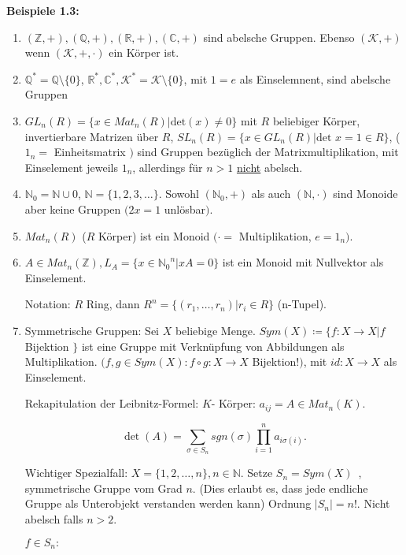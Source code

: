 \documentclass[10pt,a4paper]{article}
\begin{document}
\textbf{Beispiele 1.3:}
\begin{enumerate}
	\item $(\mathbb{Z}, +), (\mathbb{Q}, +), (\mathbb{R}, +), (\mathbb{C}, +)$ sind abelsche Gruppen. Ebenso $(\mathcal{K}, +)$ wenn $(\mathcal{K}, +, \cdot)$ ein Körper ist.
	\item $\mathbb{Q}^* = \mathbb{Q} \setminus \{0\}$, $\mathbb{R}^*, \mathbb{C}^*, \mathcal{K}^* = \mathcal{K} \setminus \{0\}$, mit $1 = e$ als Einselemnent, sind abelsche Gruppen
	\item $GL_n(R) = \{ x \in Mat_n(R) \vert \text{det}(x) \neq 0\}$ mit $R$ beliebiger Körper, invertierbare Matrizen über $R$, $SL_n(R)  = \{ x \in GL_n(R) \vert \text{det }x = 1 \in R \}$, ($1_n = $ Einheitsmatrix $)$ sind Gruppen bezüglich der Matrixmultiplikation, mit Einselement jeweils $1_n$, allerdings für $n > 1$ \underline{nicht} abelsch.
	\item $\mathbb{N}_0 = \mathbb{N} \cup 0$, $\mathbb{N} = \{1,2,3,\dots\}$. Sowohl $(\mathbb{N}_0, +)$ als auch $(\mathbb{N}, \cdot)$ sind Monoide aber keine Gruppen $(2x = 1$ unlösbar$)$.
	\item $Mat_n(R)$ ($R$ Körper) ist ein Monoid $(\cdot = $ Multiplikation, $ e = 1_n)$.
	\item $A \in Mat_n(\mathbb{Z}), L_A = \{ x \in {\mathbb{N}_0}^n \vert xA = 0\}$ ist ein Monoid mit Nullvektor als Einselement.

Notation: $R$ Ring, dann $R^n = \{(r_1, \dots, r_n) \vert r_i \in R\}$ (n-Tupel).
	\item Symmetrische Gruppen: Sei $X$ beliebige Menge. $Sym(X) \coloneqq \{ f : X \to X \vert f$ Bijektion $\}$ ist eine Gruppe mit Verknüpfung von Abbildungen als \glqq Multiplikation\grqq . $(f,g \in Sym(X): f \circ g: X \to X$ Bijektion!$)$, mit $id : X \to X$ als Einselement.
	
	
Rekapitulation der Leibnitz-Formel: $K$- Körper: $a_{ij} = A \in
Mat_n(K)$. 

$$\det(A) = \sum_{\sigma \in S_n} sgn(\sigma)
\prod_{i = 1}^{n} a_{i \sigma(i)}.$$


Wichtiger Spezialfall: $X = \{ 1,2, \dots, n \}, n \in \mathbb{N}$. Setze $S_n = Sym(X)$\glqq\ , symmetrische Gruppe vom Grad $n$\grqq . (Dies erlaubt es, dass jede endliche Gruppe als Unterobjekt verstanden werden kann) Ordnung $\vert S_n \vert = n ! $. Nicht abelsch falls $n > 2$.\bigskip

$f \in S_n:$


\end{enumerate}
\end{document}
